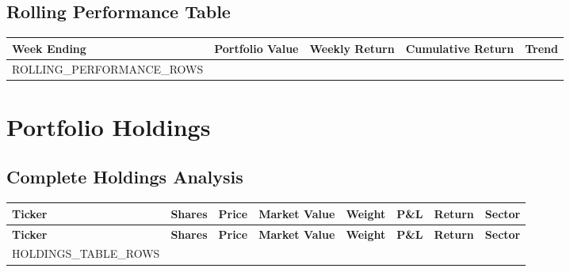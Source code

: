 \documentclass[11pt]{article}
\renewcommand{\arraystretch}{1.3}
\begin{document}
\begin{center}
\end{center}

\subsection{Rolling Performance Table}

\begin{center}
\begin{tabular}{|l|r|r|r|c|}
\hline
\rowcolor{primary!15}
\textbf{Week Ending} & \textbf{Portfolio Value} & \textbf{Weekly Return} & \textbf{Cumulative Return} & \textbf{Trend} \\
\hline
{{ROLLING_PERFORMANCE_ROWS}}
\hline
\end{tabular}
\end{center}

\section{Portfolio Holdings}

\subsection{Complete Holdings Analysis}
\renewcommand{\arraystretch}{1.2}
\small  %
\begin{longtable}{|l|>{\raggedleft\arraybackslash}r|>{\raggedleft\arraybackslash}r|>{\raggedleft\arraybackslash}r|>{\raggedleft\arraybackslash}r|>{\raggedleft\arraybackslash}r|>{\raggedleft\arraybackslash}r|l|}
\hline
\rowcolor{primary!15}
\textbf{Ticker} & \textbf{Shares} & \textbf{Price} & \textbf{Market Value} & \textbf{Weight} & \textbf{P\&L} & \textbf{Return} & \textbf{Sector} \\
\hline
\endfirsthead
\hline
\rowcolor{primary!15}
\textbf{Ticker} & \textbf{Shares} & \textbf{Price} & \textbf{Market Value} & \textbf{Weight} & \textbf{P\&L} & \textbf{Return} & \textbf{Sector} \\
\hline
\endhead
{{HOLDINGS_TABLE_ROWS}}
\hline
\end{longtable}
\normalsize  %
\end{document}
